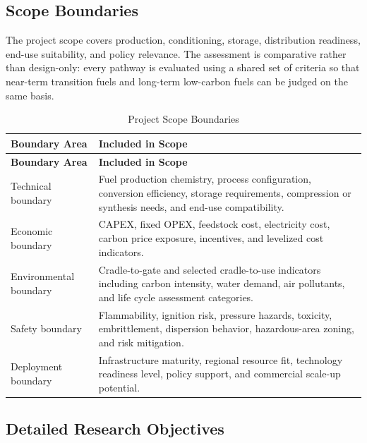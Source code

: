 \documentclass[12pt,twoside,openany]{book}
\begin{document}
\subsection{Scope Boundaries}

The project scope covers production, conditioning, storage, distribution readiness, end-use suitability, and policy relevance. The assessment is comparative rather than design-only: every pathway is evaluated using a shared set of criteria so that near-term transition fuels and long-term low-carbon fuels can be judged on the same basis.

\begin{longtable}{L{4cm} L{9cm}}
\caption{Project Scope Boundaries}\label{tab:scope_boundaries}\\
\hline
\textbf{Boundary Area} & \textbf{Included in Scope} \\
\hline
\endfirsthead
\hline
\textbf{Boundary Area} & \textbf{Included in Scope} \\
\hline
\endhead
Technical boundary & Fuel production chemistry, process configuration, conversion efficiency, storage requirements, compression or synthesis needs, and end-use compatibility. \\
Economic boundary & CAPEX, fixed OPEX, feedstock cost, electricity cost, carbon price exposure, incentives, and levelized cost indicators. \\
Environmental boundary & Cradle-to-gate and selected cradle-to-use indicators including carbon intensity, water demand, air pollutants, and life cycle assessment categories. \\
Safety boundary & Flammability, ignition risk, pressure hazards, toxicity, embrittlement, dispersion behavior, hazardous-area zoning, and risk mitigation. \\
Deployment boundary & Infrastructure maturity, regional resource fit, technology readiness level, policy support, and commercial scale-up potential. \\
\hline
\end{longtable}

\subsection{Detailed Research Objectives}
\end{document}
